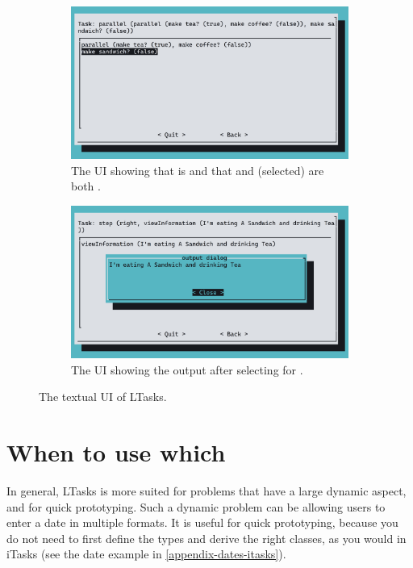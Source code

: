 \begin{figure}
\centering
\begin{subfigure}{0.8\textwidth}
    \centering
    \includegraphics[width=\textwidth]{img/screenshot-ltasks-breakfast.png}
    \caption{The UI showing that  is  and that  and  (selected) are both .}
    \label{fig:comparison_ltask_ui_1}
\end{subfigure}
\begin{subfigure}{0.8\textwidth}
    \centering
    \bigskip
    \includegraphics[width=\textwidth]{img/screenshot-ltasks-breakfast-view.png}
    \caption{The UI showing the output after selecting  for .}
    \label{fig:comparison_ltask_ui_2}
\end{subfigure}
\caption{The textual UI of LTasks.}
\label{fig:comparison_ltask_ui}
\end{figure}

\section{When to use which}
In general, LTasks is more suited for problems that have a large dynamic aspect, and for quick prototyping. Such a dynamic problem can be allowing users to enter a date in multiple formats. It is useful for quick prototyping, because you do not need to first define the types and derive the right classes, as you would in iTasks (see the date example in \ref{appendix-dates-itasks}).

